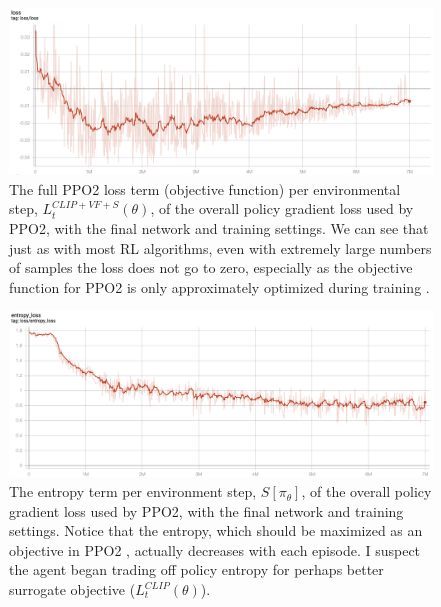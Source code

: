 \begin{figure}
    \centering
    \includegraphics[width=\textwidth]{Figures/ppo2_main_loss.png}
    \caption{The full PPO2 loss term (objective function) per environmental step, $L_{t}^{C L I P+V F+S}(\theta)$, of the overall policy gradient loss used by PPO2, with the final network and training settings. We can see that just as with most RL algorithms, even with extremely large numbers of samples the loss does not go to zero, especially as the objective function for PPO2 is only approximately optimized during training \cite{PPO2}.}
    \label{fig: ppo2_main_loss}
\end{figure}

\begin{figure}
    \centering
    \includegraphics[width=\textwidth]{Figures/ppo2_entropy_loss_term.png}
    \caption{The entropy term per environment step, $S\left[\pi_{\theta}\right]$, of the overall policy gradient loss used by PPO2, with the final network and training settings. Notice that the entropy, which should be maximized as an objective in PPO2 \cite{PPO2}, actually decreases with each episode. I suspect the agent began trading off policy entropy for perhaps better surrogate objective ($L_{t}^{C L I P}(\theta)$).}
    \label{fig: ppo2_entropy_loss_term}
\end{figure}

